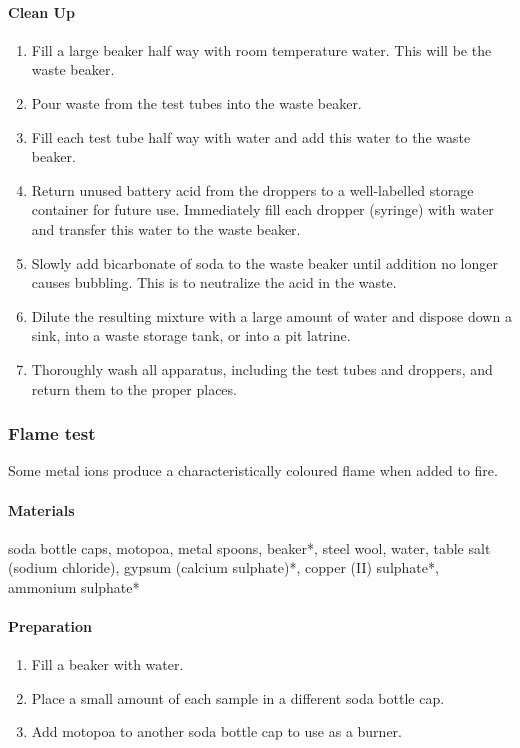 \paragraph{Clean Up}
\begin{enumerate}
\item{Fill a large beaker half way with room temperature water. This will be the waste beaker.}
\item{Pour waste from the test tubes into the waste beaker.}
\item{Fill each test tube half way with water and add this water to the waste beaker.}
\item{Return unused battery acid from the droppers to a well-labelled storage container for future use. Immediately fill each dropper (syringe) with water and transfer this water to the waste beaker.}
\item{Slowly add bicarbonate of soda to the waste beaker until addition no longer causes bubbling. This is to neutralize the acid in the waste.}
\item{Dilute the resulting mixture with a large amount of water and dispose down a sink, into a waste storage tank, or into a pit latrine.}
\item{Thoroughly wash all apparatus, including the test tubes and droppers, and return them to the proper places.}
\end{enumerate}

\subsubsection{Flame test}

Some metal ions produce a characteristically coloured flame when added to fire.

\paragraph{Materials}
soda bottle caps, motopoa, metal spoons, beaker*, steel wool, water, table salt (sodium chloride), gypsum (calcium sulphate)*, copper (II) sulphate*, ammonium sulphate*

\paragraph{Preparation}
\begin{enumerate}
\item{Fill a beaker with water.}
\item{Place a small amount of each sample in a different soda bottle cap.}
\item{Add motopoa to another soda bottle cap to use as a burner.}
\end{enumerate}

